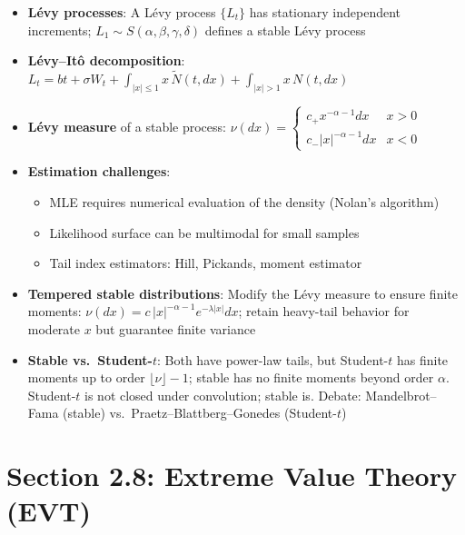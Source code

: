 \documentclass[11pt, a4paper]{article}
\theoremstyle{definition}
\begin{document}
\begin{itemize}
  \item \textbf{Lévy processes}: A Lévy process $\{L_t\}$ has stationary independent increments; $L_1 \sim S(\alpha, \beta, \gamma, \delta)$ defines a stable Lévy process
  \item \textbf{Lévy--Itô decomposition}: $L_t = bt + \sigma W_t + \int_{|x|\leq 1} x\,\tilde{N}(t,dx) + \int_{|x|>1} x\,N(t,dx)$
  \item \textbf{Lévy measure} of a stable process: $\nu(dx) = \begin{cases} c_+ x^{-\alpha-1}dx & x > 0 \\ c_- |x|^{-\alpha-1}dx & x < 0 \end{cases}$
  \item \textbf{Estimation challenges}:
  \begin{itemize}
    \item MLE requires numerical evaluation of the density (Nolan's algorithm)
    \item Likelihood surface can be multimodal for small samples
    \item Tail index estimators: Hill, Pickands, moment estimator
  \end{itemize}
  \item \textbf{Tempered stable distributions}: Modify the Lévy measure to ensure finite moments: $\nu(dx) = c\,|x|^{-\alpha-1}e^{-\lambda|x|}dx$; retain heavy-tail behavior for moderate $x$ but guarantee finite variance
  \item \textbf{Stable vs.\ Student-$t$}: Both have power-law tails, but Student-$t$ has finite moments up to order $\lfloor\nu\rfloor - 1$; stable has no finite moments beyond order $\alpha$. Student-$t$ is not closed under convolution; stable is. Debate: Mandelbrot--Fama (stable) vs.\ Praetz--Blattberg--Gonedes (Student-$t$)
\end{itemize}

\section{Section 2.8: Extreme Value Theory (EVT)}
\end{document}
